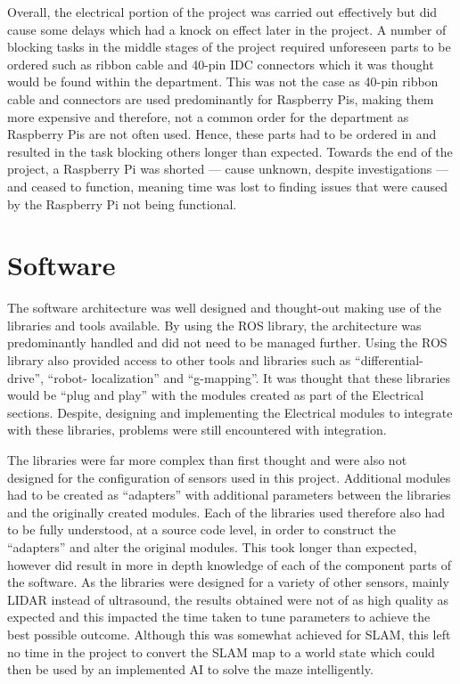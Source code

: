 Overall, the electrical portion of the project was carried out effectively but did 
cause some delays which had a knock on effect later in the project. A number of 
blocking tasks in the middle stages of the project required unforeseen parts to be 
ordered such as ribbon cable and 40-pin IDC connectors which it was thought would 
be found within the department. This was not the case as 40-pin ribbon cable and 
connectors are used predominantly for Raspberry Pis, making them more expensive 
and therefore, not a common order for the department as Raspberry Pis are not often 
used. Hence, these parts had to be ordered in and resulted in the task blocking 
others longer than expected. Towards the end of the project, a Raspberry Pi was 
shorted --- cause unknown, despite investigations --- and ceased to function, 
meaning time was lost to finding issues that were caused by the Raspberry Pi not 
being functional.    
 
\section{Software}\label{eval/soft}
The software architecture was well designed and thought-out making use of the 
libraries and tools available. By using the ROS library, the architecture was predominantly handled
and did not need to be managed further. Using the ROS library also provided 
access to other tools and libraries such as ``differential-drive'', ``robot-
localization'' and ``g-mapping''. It was thought that these libraries would be ``plug 
and play'' with the modules created as part of the Electrical sections. Despite, 
designing and implementing the Electrical modules to integrate with these libraries, 
problems were still encountered with integration. 

The libraries were far more complex than first thought and were also not designed for 
the configuration of sensors used in this project. Additional modules had to be 
created as ``adapters'' with additional parameters between the libraries and the 
originally created modules. Each of the libraries used therefore also had to be fully 
understood, at a source code level, in order to construct the ``adapters'' and alter 
the original modules. This took longer than expected, however did result in more in 
depth knowledge of each of the component parts of the software. As the libraries were 
designed for a variety of other sensors, mainly LIDAR instead of ultrasound, the 
results obtained were not of as high quality as expected and this impacted the time 
taken to tune parameters to achieve the best possible outcome. Although this was 
somewhat achieved for SLAM, this left no time in the project to convert the SLAM map 
to a world state which could then be used by an implemented AI to solve the maze 
intelligently. 


